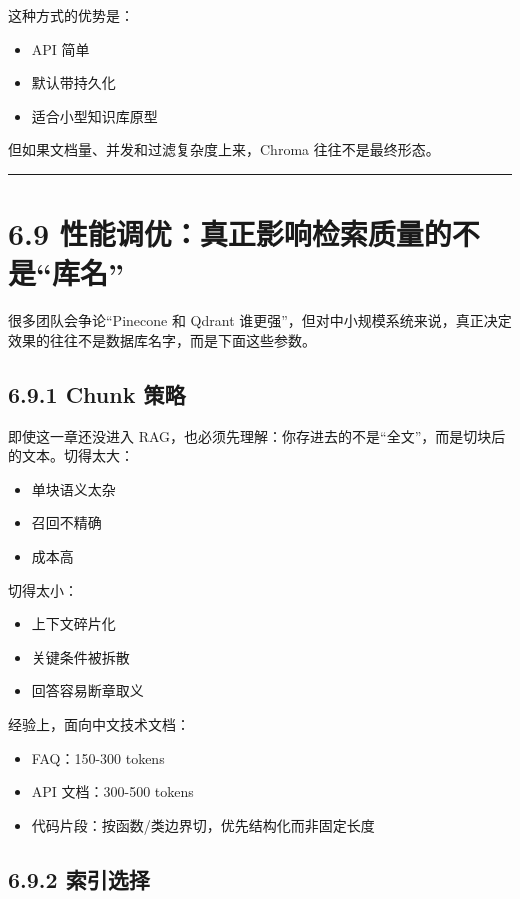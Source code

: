这种方式的优势是：


\begin{itemize}[leftmargin=2em]
\item API 简单
\item 默认带持久化
\item 适合小型知识库原型
\end{itemize}

但如果文档量、并发和过滤复杂度上来，Chroma 往往不是最终形态。


\bigskip\hrule\bigskip

\section{6.9 性能调优：真正影响检索质量的不是``库名''}

很多团队会争论``Pinecone 和 Qdrant 谁更强''，但对中小规模系统来说，真正决定效果的往往不是数据库名字，而是下面这些参数。


\subsection{6.9.1 Chunk 策略}

即使这一章还没进入 RAG，也必须先理解：你存进去的不是``全文''，而是切块后的文本。切得太大：


\begin{itemize}[leftmargin=2em]
\item 单块语义太杂
\item 召回不精确
\item 成本高
\end{itemize}

切得太小：


\begin{itemize}[leftmargin=2em]
\item 上下文碎片化
\item 关键条件被拆散
\item 回答容易断章取义
\end{itemize}

经验上，面向中文技术文档：


\begin{itemize}[leftmargin=2em]
\item FAQ：150-300 tokens
\item API 文档：300-500 tokens
\item 代码片段：按函数/类边界切，优先结构化而非固定长度
\end{itemize}

\subsection{6.9.2 索引选择}

